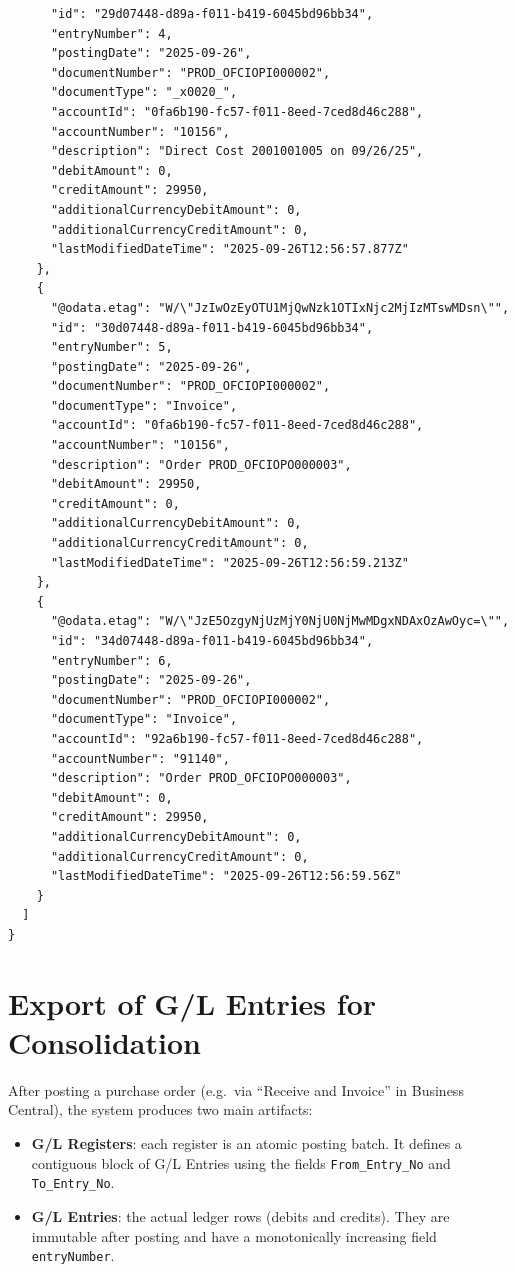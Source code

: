 \documentclass[a4paper,10pt]{article}
\begin{document}
\begin{verbatim}
      "id": "29d07448-d89a-f011-b419-6045bd96bb34",
      "entryNumber": 4,
      "postingDate": "2025-09-26",
      "documentNumber": "PROD_OFCIOPI000002",
      "documentType": "_x0020_",
      "accountId": "0fa6b190-fc57-f011-8eed-7ced8d46c288",
      "accountNumber": "10156",
      "description": "Direct Cost 2001001005 on 09/26/25",
      "debitAmount": 0,
      "creditAmount": 29950,
      "additionalCurrencyDebitAmount": 0,
      "additionalCurrencyCreditAmount": 0,
      "lastModifiedDateTime": "2025-09-26T12:56:57.877Z"
    },
    {
      "@odata.etag": "W/\"JzIwOzEyOTU1MjQwNzk1OTIxNjc2MjIzMTswMDsn\"",
      "id": "30d07448-d89a-f011-b419-6045bd96bb34",
      "entryNumber": 5,
      "postingDate": "2025-09-26",
      "documentNumber": "PROD_OFCIOPI000002",
      "documentType": "Invoice",
      "accountId": "0fa6b190-fc57-f011-8eed-7ced8d46c288",
      "accountNumber": "10156",
      "description": "Order PROD_OFCIOPO000003",
      "debitAmount": 29950,
      "creditAmount": 0,
      "additionalCurrencyDebitAmount": 0,
      "additionalCurrencyCreditAmount": 0,
      "lastModifiedDateTime": "2025-09-26T12:56:59.213Z"
    },
    {
      "@odata.etag": "W/\"JzE5OzgyNjUzMjY0NjU0NjMwMDgxNDAxOzAwOyc=\"",
      "id": "34d07448-d89a-f011-b419-6045bd96bb34",
      "entryNumber": 6,
      "postingDate": "2025-09-26",
      "documentNumber": "PROD_OFCIOPI000002",
      "documentType": "Invoice",
      "accountId": "92a6b190-fc57-f011-8eed-7ced8d46c288",
      "accountNumber": "91140",
      "description": "Order PROD_OFCIOPO000003",
      "debitAmount": 0,
      "creditAmount": 29950,
      "additionalCurrencyDebitAmount": 0,
      "additionalCurrencyCreditAmount": 0,
      "lastModifiedDateTime": "2025-09-26T12:56:59.56Z"
    }
  ]
}
\end{verbatim}

\newpage

\section{Export of G/L Entries for Consolidation}

After posting a purchase order (e.g.\ via ``Receive and Invoice'' in Business Central), the system produces two main artifacts:

\begin{itemize}
  \item \textbf{G/L Registers}: each register is an atomic posting batch. It defines a contiguous block of G/L Entries using the fields \texttt{From\_Entry\_No} and \texttt{To\_Entry\_No}.
  \item \textbf{G/L Entries}: the actual ledger rows (debits and credits). They are immutable after posting and have a monotonically increasing field \texttt{entryNumber}.
\end{itemize}
\end{document}
